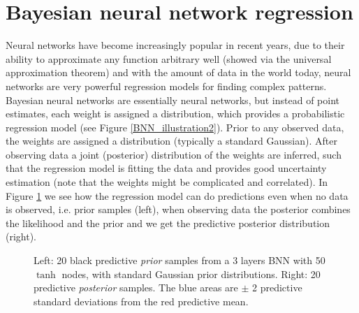 \section{Bayesian neural network regression}\label{BNN} 

Neural networks have become increasingly popular in recent years, due to their ability to
approximate any function arbitrary well (showed via the universal approximation theorem) and with
the amount of data in the world today, neural networks are very powerful regression models for
finding complex patterns. Bayesian neural networks are essentially neural networks, but instead of
point estimates, each weight is assigned a distribution, which provides a probabilistic regression
model (see Figure \ref{BNN_illustration2}). Prior to any observed data, the weights are assigned a
distribution (typically a standard Gaussian). After observing data a joint (posterior) distribution
of the weights are inferred, such that the regression model is fitting the data and provides good
uncertainty estimation (note that the weights might be complicated and correlated). In Figure
\ref{BNN_prior_posterior} we see how the regression model can do predictions even when no data is
observed, i.e. prior samples (left), when observing data the posterior combines the likelihood and
the prior and we get the predictive posterior distribution (right). 
\begin{figure}[H]
    \qquad
    \caption{Left: 20 black predictive \textit{prior} samples from a 3 layers BNN with 50 $\tanh$ nodes, with standard Gaussian prior distributions. 
     Right: 20 predictive \textit{posterior} samples. The blue areas are $\pm$ 2 predictive standard
     deviations from the red predictive mean.}%
    \label{BNN_prior_posterior}%
\end{figure}


